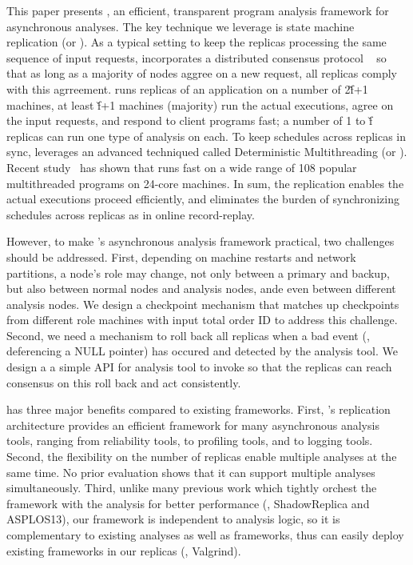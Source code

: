 This paper presents \xxx, an efficient, transparent program 
analysis framework for asynchronous analyses. The key technique we leverage is 
state machine replication (or \smr). As a typical \smr setting to keep the 
replicas processing the same sequence of input requests, \xxx incorporates a 
distributed consensus protocol \paxos~\cite{paxos} so that as long as a 
majority of nodes aggree on a new request, all replicas comply with this 
agrreement. \xxx runs replicas of an application on a number of 2\v{f}+1 
machines, at least \v{f}+1 machines (majority) run the actual executions, agree 
on the input requests, and respond to client programs fast; a number of 1 to 
\v{f} replicas can run one type of analysis on each. To keep 
schedules across replicas in sync, \repbox leverages an advanced techniqued 
called Deterministic Multithreading (or \dmt). Recent 
study~\cite{parrot:sosp13} has shown that \dmt runs fast on a wide range of 108 
popular multithreaded programs on 24-core machines. In sum, the \smr 
replication enables the actual executions proceed efficiently, and \dmt 
eliminates the burden of synchronizing schedules across replicas as in online
record-replay.


However, to make \xxx's asynchronous analysis framework practical, two 
challenges should be addressed. First, depending on machine restarts and 
network partitions, a node's role may change, not only between a \paxos primary 
and backup, but also between normal nodes and analysis nodes, ande even between 
different analysis nodes. We design a checkpoint mechanism that matches up 
checkpoints from different role machines with input total order ID to address 
this challenge. Second, we need a mechanism to roll back all replicas when a 
bad event (\eg, deferencing a NULL pointer) has occured and detected by the 
analysis tool. We design a a simple API for analysis tool to invoke so that the 
replicas can reach consensus on this roll back and act consistently.


\xxx has three major benefits compared to existing frameworks. First, \xxx's 
replication architecture provides an efficient framework for many asynchronous 
analysis tools, ranging from reliability tools, to profiling tools, and to 
logging tools. Second, the flexibility on the number of replicas enable 
multiple analyses at the same time. No prior evaluation shows that it can 
support multiple analyses simultaneously. Third, unlike many previous work 
which tightly orchest the framework with the analysis for better performance 
(\eg, ShadowReplica and ASPLOS13), our framework is independent to analysis 
logic, so it is complementary to existing analyses as well as frameworks, thus 
\xxx can easily deploy existing frameworks in our replicas (\eg, Valgrind).


